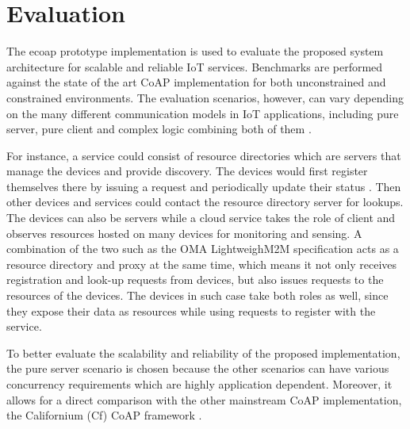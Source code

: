 \chapter{Evaluation}\label{ch5}

The ecoap prototype implementation is used to evaluate the proposed system architecture for scalable and reliable IoT services. Benchmarks are performed against the state of the art CoAP implementation for both unconstrained and constrained environments. The evaluation scenarios, however, can vary depending on the many different communication models in IoT applications, including pure server, pure client and complex logic combining both of them \autocite{kovatsch2015scalable}. 

For instance, a service could consist of resource directories which are servers that manage the devices and provide discovery. The devices would first register themselves there by issuing a request and periodically update their status \autocite{core_directory}. Then other devices and services could contact the resource directory server for lookups. The devices can also be servers while a cloud service takes the role of client and observes resources hosted on many devices for monitoring and sensing. A combination of the two such as the OMA LightweighM2M \autocite{lwm2m} specification acts as a resource directory and proxy at the same time, which means it not only receives registration and look-up requests from devices, but also issues requests to the resources of the devices. The devices in such case take both roles as well, since they expose their data as resources while using requests to register with the service.

To better evaluate the scalability and reliability of the proposed implementation, the pure server scenario is chosen because the other scenarios can have various concurrency requirements which are highly application dependent. Moreover, it allows for a direct comparison with the other mainstream CoAP implementation, the Californium (Cf) CoAP framework \autocite{californium}.

